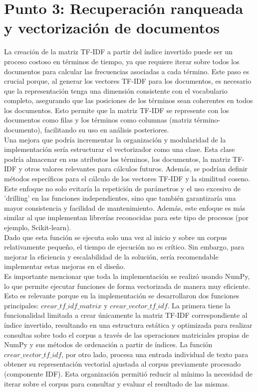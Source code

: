 \documentclass[11pt,english]{article}
\theoremstyle{plain}
\begin{document}
\section*{Punto 3: Recuperación ranqueada y vectorización de documentos}

La creación de la matriz TF-IDF a partir del índice invertido puede ser un proceso costoso en términos de tiempo, ya que requiere iterar sobre todos los documentos para calcular las frecuencias asociadas a cada término. Este paso es crucial porque, al generar los vectores TF-IDF para los documentos, es necesario que la representación tenga una dimensión consistente con el vocabulario completo, asegurando que las posiciones de los términos sean coherentes en todos los documentos. Esto permite que la matriz TF-IDF se represente con los documentos como filas y los términos como columnas (matriz término-documento), facilitando su uso en análisis posteriores.\\

\noindent Una mejora que podría incrementar la organización y modularidad de la implementación sería estructurar el vectorizador como una clase. Esta clase podría almacenar en sus atributos los términos, los documentos, la matriz TF-IDF y otros valores relevantes para cálculos futuros. Además, se podrían definir métodos específicos para el cálculo de los vectores TF-IDF y la similitud coseno. Este enfoque no solo evitaría la repetición de parámetros y el uso excesivo de 'drilling' en las funciones independientes, sino que también garantizaría una mayor consistencia y facilidad de mantenimiento. Además, este enfoque es más similar al que implementan librerías reconocidas para este tipo de procesos (por ejemplo, Scikit-learn). \\

\noindent Dado que esta función se ejecuta solo una vez al inicio y sobre un corpus relativamente pequeño, el tiempo de ejecución no es crítico. Sin embargo, para mejorar la eficiencia y escalabilidad de la solución, sería recomendable implementar estas mejoras en el diseño.\\

\noindent Es importante mencionar que toda la implementación se realizó usando NumPy, lo que permite ejecutar funciones de forma vectorizada de manera muy eficiente. Esto es relevante porque en la implementación se desarrollaron dos funciones principales: $crear\_tf\_idf\_matrix$ y $crear\_vector\_tf\_idf$. La primera tiene la funcionalidad limitada a crear únicamente la matriz TF-IDF correspondiente al índice invertido, resultando en una estructura estática y optimizada para realizar consultas sobre todo el corpus a través de las operaciones matriciales propias de NumPy y sus métodos de ordenación a partir de índices. La función $crear\_vector\_tf\_idf$, por otro lado, procesa una entrada individual de texto para obtener su representación vectorial ajustada al corpus previamente procesado (componente IDF). Esta organización permitió reducir al mínimo la necesidad de iterar sobre el corpus para consultar y evaluar el resultado de las mismas. \\
\end{document}
